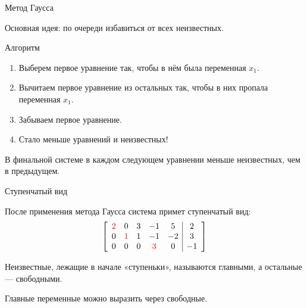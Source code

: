 \begin{frame}{Метод Гаусса}

Основная идея: по очереди избавиться от всех неизвестных.
\pause

\begin{block}{Алгоритм}
\begin{enumerate}
    \item Выберем первое уравнение так, чтобы в нём была переменная $x_1$.
    \pause
    \item Вычитаем первое уравнение из остальных так, чтобы в них пропала переменная $x_1$.
    \pause
    \item Забываем первое уравнение.
    \pause
    \item Стало меньше уравнений и неизвестных!
\end{enumerate}
\end{block}


\pause
В финальной системе в каждом следующем уравнении меньше неизвестных, чем в предыдущем.



\end{frame}



\begin{frame}{Ступенчатый вид}


После применения метода Гаусса система примет ступенчатый вид:
\[
\left[
\begin{array}{ccccc|c}
\textcolor{red}{2} & 0 & 3 & -1 & 5 & 2 \\
0 & \textcolor{red}{1} & 1 & -1 & -2 & 3 \\
0 & 0 & 0 & \textcolor{red}{3} & 0 & -1 \\
\end{array}
\right]
\]

\pause
Неизвестные, лежащие в начале «ступеньки», называются \alert{главными}, а остальные —
\alert{свободными}.

Главные переменные можно выразить через свободные.

\end{frame}





